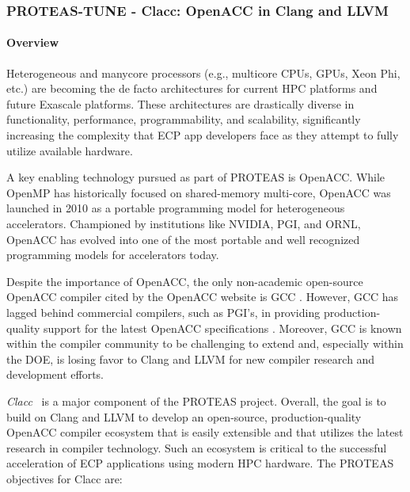 \subsubsection{ PROTEAS-TUNE - Clacc: OpenACC in Clang and LLVM}\label{s:clacc}

\newcommand{\todo}[1]{\textbf{\textcolor{red}{#1}}}

\paragraph{Overview}

Heterogeneous and manycore processors (e.g., multicore CPUs, GPUs,
Xeon Phi, etc.) are becoming the de facto architectures for current
HPC platforms and future Exascale platforms.  These architectures are
drastically diverse in functionality, performance, programmability,
and scalability, significantly increasing the complexity that ECP app
developers face as they attempt to fully utilize available hardware.

A key enabling technology pursued as part of PROTEAS is OpenACC.
While OpenMP has historically focused on shared-memory multi-core,
OpenACC was launched in 2010 as a portable programming model for
heterogeneous accelerators.  Championed by institutions like NVIDIA,
PGI, and ORNL, OpenACC has evolved into one of the most portable and
well recognized programming models for accelerators today.

Despite the importance of OpenACC, the only non-academic open-source OpenACC
compiler cited by the OpenACC website is GCC \cite{openaccOrgTools}.
However, GCC has lagged behind commercial compilers, such as PGI's, in
providing production-quality support for the latest OpenACC specifications
\cite{openACCValidationSuite}.  Moreover, GCC is known within the compiler
community to be challenging to extend and, especially within the DOE, is
losing favor to Clang and LLVM for new compiler research and development
efforts.

\textit{Clacc}~\cite{clacc:2018:denny} is a major component of the
PROTEAS project.  Overall, the goal is to build on Clang and LLVM to
develop an open-source, production-quality OpenACC compiler ecosystem
that is easily extensible and that utilizes the latest research in
compiler technology.  Such an ecosystem is critical to the successful
acceleration of ECP applications using modern HPC hardware.  The
PROTEAS objectives for Clacc are:

